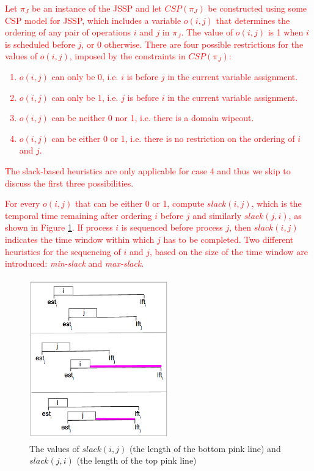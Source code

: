 \documentclass{mprop}
\theoremstyle{definition}
\begin{document}
\textcolor{red}{
Let $\pi_{J}$ be an instance of the JSSP and let $CSP(\pi_{J})$ be constructed using some CSP model for JSSP, which includes a variable $o(i,j)$ that determines the ordering of any pair of operations $i$ and $j$ in $\pi_{J}$. The value of $o(i,j)$ is 1 when $i$ is scheduled before $j$, or 0 otherwise. There are four possible restrictions for the values of $o(i,j)$, imposed by the constraints in $CSP(\pi_{J})$: 
\begin{enumerate}
\item $o(i,j)$ can only be 0, i.e. $i$ is before $j$ in the current variable assignment.
\item $o(i,j)$ can only be 1, i.e. $j$ is before $i$ in the current variable assignment.
\item $o(i,j)$ can be neither 0 nor 1, i.e. there is a domain wipeout.
\item $o(i,j)$ can be either 0 or 1, i.e. there is no restriction on the ordering of $i$ and $j$.
\end{enumerate}
The slack-based heuristics are only applicable for case 4 and thus we skip to discuss the first three possibilities.}

\textcolor{red}{
For every $o(i,j)$ that can be either 0 or 1, \citet{Smith93} compute $slack(i, j)$, which is the temporal time remaining after ordering $i$ before $j$ and similarly $slack(j, i)$, as shown in Figure \ref{fig:slack}. If process $i$ is sequenced before process $j$, then $slack(i, j)$ indicates the time window within which $j$ has to be completed.
Two different heuristics for the sequencing of $i$ and $j$, based on the size of the time window are introduced: \textit{min-slack} and \textit{max-slack}.}

\begin{figure}
\centering
\includegraphics[height=7cm, width=6cm]{images/slack.png}
\caption{The values of $slack(i, j)$ (the length of the bottom pink line) and $slack(j, i)$ (the length of the top pink line)}
\label{fig:slack}
\end{figure}
\end{document}
